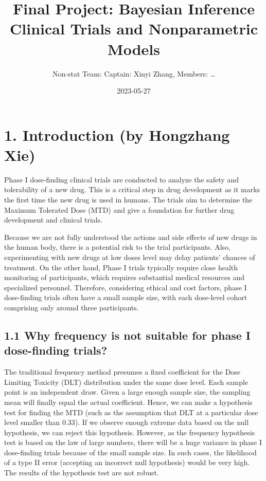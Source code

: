 \documentclass[
]{article}
\title{Final Project: Bayesian Inference Clinical Trials and
Nonparametric Models}
\author{Non-stat Team: Captain: Xinyi Zhang, Members: \ldots{}}
\date{2023-05-27}
\begin{document}
\maketitle

\hypertarget{introduction-by-hongzhang-xie}{%
\section{1. Introduction (by Hongzhang
Xie)}\label{introduction-by-hongzhang-xie}}

Phase I dose-finding clinical trials are conducted to analyze the safety
and tolerability of a new drug. This is a critical step in drug
development as it marks the first time the new drug is used in humans.
The trials aim to determine the Maximum Tolerated Dose (MTD) and give a
foundation for further drug development and clinical trials.

Because we are not fully understood the actions and side effects of new
drugs in the human body, there is a potential risk to the trial
participants. Also, experimenting with new drugs at low doses level may
delay patients' chances of treatment. On the other hand, Phase I trials
typically require close health monitoring of participants, which
requires substantial medical resources and specialized personnel.
Therefore, considering ethical and cost factors, phase I dose-finding
trials often have a small sample size, with each dose-level cohort
comprising only around three participants.

\hypertarget{why-frequency-is-not-suitable-for-phase-i-dose-finding-trials}{%
\subsection{1.1 Why frequency is not suitable for phase I dose-finding
trials?}\label{why-frequency-is-not-suitable-for-phase-i-dose-finding-trials}}

The traditional frequency method presumes a fixed coefficient for the
Dose Limiting Toxicity (DLT) distribution under the same dose level.
Each sample point is an independent draw. Given a large enough sample
size, the sampling mean will finally equal the actual coefficient.
Hence, we can make a hypothesis test for finding the MTD (such as the
assumption that DLT at a particular dose level smaller than 0.33). If we
observe enough extreme data based on the null hypothesis, we can reject
this hypothesis. However, as the frequency hypothesis test is based on
the law of large numbers, there will be a huge variance in phase I
dose-finding trials because of the small sample size. In such cases, the
likelihood of a type II error (accepting an incorrect null hypothesis)
would be very high. The results of the hypothesis test are not robust.
\end{document}
